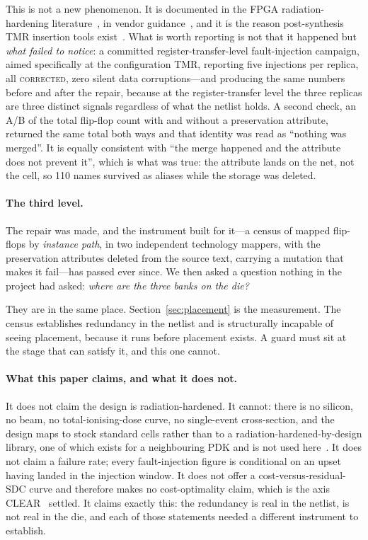 \documentclass[11pt,a4paper]{article}
\begin{document}
This is not a new phenomenon. It is documented in the FPGA
radiation-hardening literature~\cite{kastensmidt2005}, in vendor
guidance~\cite{esa_ftmr}, and it is the reason post-synthesis TMR
insertion tools exist~\cite{tmrg2017,johnson2010}. What is worth
reporting is not that it happened but \emph{what failed to notice}: a
committed register-transfer-level fault-injection campaign, aimed
specifically at the configuration TMR, reporting five injections per
replica, all \textsc{corrected}, zero silent data corruptions---and
producing the same numbers before and after the repair, because at the
register-transfer level the three replicas are three distinct signals
regardless of what the netlist holds. A second check, an A/B of the total
flip-flop count with and without a preservation attribute, returned the
same total both ways and that identity was read as ``nothing was
merged''. It is equally consistent with ``the merge happened and the
attribute does not prevent it'', which is what was true: the attribute
lands on the net, not the cell, so 110 names survived as aliases while
the storage was deleted.

\paragraph{The third level.}
The repair was made, and the instrument built for it---a census of mapped
flip-flops by \emph{instance path}, in two independent technology
mappers, with the preservation attributes deleted from the source text,
carrying a mutation that makes it fail---has passed ever since. We then
asked a question nothing in the project had asked: \emph{where are the
three banks on the die?}

They are in the same place. Section~\ref{sec:placement} is the
measurement. The census establishes redundancy in the netlist and is
structurally incapable of seeing placement, because it runs before
placement exists. A guard must sit at the stage that can satisfy it, and
this one cannot.

\paragraph{What this paper claims, and what it does not.}
It does not claim the design is radiation-hardened. It cannot: there is
no silicon, no beam, no total-ionising-dose curve, no single-event
cross-section, and the design maps to stock standard cells rather than to
a radiation-hardened-by-design library, one of which exists for a
neighbouring PDK and is not used here~\cite{sky130rhbd}. It does not
claim a failure rate; every fault-injection figure is conditional on an
upset having landed in the injection window. It does not offer a
cost-versus-residual-SDC curve and therefore makes no cost-optimality
claim, which is the axis CLEAR~\cite{clear2018} settled.
It claims exactly this: the redundancy is real in the netlist, is not
real in the die, and each of those statements needed a different
instrument to establish.
\end{document}
